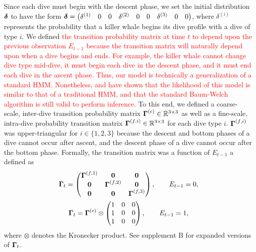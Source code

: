 Since each dive must begin with the descent phase, we set the initial distribution $\boldsymbol{\delta}$ to have the form
%
    $\boldsymbol{\delta} = \begin{pmatrix} \delta^{(1)} & 0 & 0 & \delta^{(2)} & 0 & 0 & \delta^{(3)} & 0 & 0 \end{pmatrix}$,
%
where $\delta^{(i)}$ represents the probability that a killer whale begins its dive profile with a dive of type $i$. 
%
We defined 
\textcolor{red}{the transition probability matrix at time $t$ to depend upon the previous observation $E_{t-1}$ because the transition matrix will naturally depend upon when a dive begins and ends. For example, the killer whale cannot change dive type mid-dive, it must begin each dive in the descent phase, and it must end each dive in the ascent phase. Thus, our model is technically a generalization of a standard HMM. Nonetheless, \citet{Li:2005} and \citet{Tamposis:2018b} have shown that the likelihood of this model is similar to that of a traditional HMM, and that the standard Baum-Welch algorithm is still valid to perform inference.} To this end, we defined a coarse-scale, inter-dive transition probability matrix $\boldsymbol{\Gamma}^{(c)} \in \mathbb{R}^{3 \times 3}$ as well as a fine-scale, intra-dive probability transition matrix $\boldsymbol{\Gamma}^{(f,i)} \in \mathbb{R}^{3 \times 3}$ for each dive type $i$. $\boldsymbol{\Gamma}^{(f,i)}$ was upper-triangular for $i \in \{1,2,3\}$ because the descent and bottom phases of a dive cannot occur after ascent, and the descent phase of a dive cannot occur after the bottom phase. Formally, the transition matrix was a function of $E_{t-1}$ a defined as
%
\begin{gather}
    \boldsymbol{\Gamma}_t = 
    \begin{pmatrix}
        \boldsymbol{\Gamma}^{(f,1)} & \mathbf{0} & \mathbf{0} \\
        \mathbf{0} & \boldsymbol{\Gamma}^{(f,2)} & \mathbf{0} \\
        \mathbf{0} & \mathbf{0} & \boldsymbol{\Gamma}^{(f,3)} \\
    \end{pmatrix}, \qquad E_{t-1} = 0, \\
    \boldsymbol{\Gamma}_t = \boldsymbol{\Gamma}^{(c)} \otimes \begin{pmatrix} 1 & 0 & 0 \\ 1 & 0 & 0 \\ 1 & 0 & 0 \end{pmatrix}, \qquad E_{t-1} = 1,
\end{gather}
%
where $\otimes$ denotes the Kronecker product. See supplement B for expanded versions of $\boldsymbol{\Gamma}_t$.

